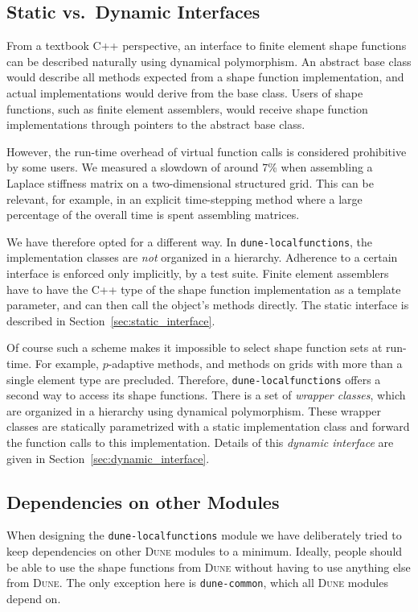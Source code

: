 \documentclass[a4paper,11pt]{article}
\newcommand{\dune}{\textsc{Dune}\xspace}
\newcommand{\modulename}[1]{\texttt{#1}\xspace}
\begin{document}
\subsection{Static vs.\ Dynamic Interfaces}

From a textbook C++ perspective, an interface to finite element shape functions
can be described naturally using dynamical polymorphism.  An abstract base
class would describe all methods expected from a shape function implementation,
and actual implementations would derive from the base class.  Users of shape functions,
such as finite element assemblers, would receive shape function implementations
through pointers to the abstract base class.

However, the run-time overhead of virtual function calls is considered prohibitive
by some users.  We measured a slowdown of around 7\% when assembling a Laplace
stiffness matrix on a two-dimensional structured grid.  This can be relevant,
for example, in an explicit time-stepping method where a large percentage of
the overall time is spent assembling matrices.

We have therefore opted for a different way.  In \modulename{dune-localfunctions},
the implementation classes are {\em not} organized in a hierarchy.  Adherence
to a certain interface is enforced only implicitly, by a test suite.  Finite
element assemblers have to have the C++ type of the shape function implementation
as a template parameter, and can then call the object's methods directly.
The static interface is described in Section~\ref{sec:static_interface}.

Of course such a scheme makes it impossible to select shape function sets at run-time.
For example, $p$-adaptive methods, and methods on grids with more than a single
element type are precluded.  Therefore, \modulename{dune-localfunctions} offers
a second way to access its shape functions.  There is a set of {\em wrapper classes},
which are organized in a hierarchy using dynamical polymorphism.  These
wrapper classes are statically parametrized with a static implementation class
and forward the function calls to this implementation.  Details of this
{\em dynamic interface} are given in Section~\ref{sec:dynamic_interface}.

\subsection{Dependencies on other Modules}

When designing the \modulename{dune-localfunctions} module we have deliberately
tried to keep dependencies on other \dune modules to a minimum.  Ideally,
people should be able to use the shape functions from \dune without having
to use anything else from \dune.  The only exception here is \modulename{dune-common},
which all \dune modules depend on.
\end{document}

